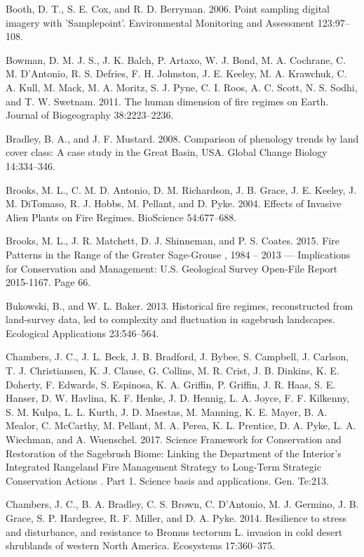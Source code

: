 \documentclass[12pt,]{article}
\begin{document}
\hypertarget{ref-Booth2006}{}
Booth, D. T., S. E. Cox, and R. D. Berryman. 2006. Point sampling
digital imagery with 'Samplepoint'. Environmental Monitoring and
Assessment 123:97--108.

\hypertarget{ref-Bowman2011}{}
Bowman, D. M. J. S., J. K. Balch, P. Artaxo, W. J. Bond, M. A. Cochrane,
C. M. D'Antonio, R. S. Defries, F. H. Johnston, J. E. Keeley, M. A.
Krawchuk, C. A. Kull, M. Mack, M. A. Moritz, S. J. Pyne, C. I. Roos, A.
C. Scott, N. S. Sodhi, and T. W. Swetnam. 2011. The human dimension of
fire regimes on Earth. Journal of Biogeography 38:2223--2236.

\hypertarget{ref-Bradley2008}{}
Bradley, B. A., and J. F. Mustard. 2008. Comparison of phenology trends
by land cover class: A case study in the Great Basin, USA. Global Change
Biology 14:334--346.

\hypertarget{ref-Brooks2004b}{}
Brooks, M. L., C. M. D. Antonio, D. M. Richardson, J. B. Grace, J. E.
Keeley, J. M. DiTomaso, R. J. Hobbs, M. Pellant, and D. Pyke. 2004.
Effects of Invasive Alien Plants on Fire Regimes. BioScience
54:677--688.

\hypertarget{ref-Brooks2015}{}
Brooks, M. L., J. R. Matchett, D. J. Shinneman, and P. S. Coates. 2015.
Fire Patterns in the Range of the Greater Sage-Grouse , 1984 -- 2013 ---
Implications for Conservation and Management: U.S. Geological Survey
Open-File Report 2015-1167. Page 66.

\hypertarget{ref-Bukowski2013}{}
Bukowski, B., and W. L. Baker. 2013. Historical fire regimes,
reconstructed from land-survey data, led to complexity and fluctuation
in sagebrush landscapes. Ecological Applications 23:546--564.

\hypertarget{ref-Chambers2017}{}
Chambers, J. C., J. L. Beck, J. B. Bradford, J. Bybee, S. Campbell, J.
Carlson, T. J. Christiansen, K. J. Clause, G. Collins, M. R. Crist, J.
B. Dinkins, K. E. Doherty, F. Edwards, S. Espinosa, K. A. Griffin, P.
Griffin, J. R. Haas, S. E. Hanser, D. W. Havlina, K. F. Henke, J. D.
Hennig, L. A. Joyce, F. F. Kilkenny, S. M. Kulpa, L. L. Kurth, J. D.
Maestas, M. Manning, K. E. Mayer, B. A. Mealor, C. McCarthy, M. Pellant,
M. A. Perea, K. L. Prentice, D. A. Pyke, L. A. Wiechman, and A.
Wuenschel. 2017. Science Framework for Conservation and Restoration of
the Sagebrush Biome: Linking the Department of the Interior's Integrated
Rangeland Fire Management Strategy to Long-Term Strategic Conservation
Actions . Part 1. Science basis and applications. Gen. Te:213.

\hypertarget{ref-Chambers2014}{}
Chambers, J. C., B. A. Bradley, C. S. Brown, C. D'Antonio, M. J.
Germino, J. B. Grace, S. P. Hardegree, R. F. Miller, and D. A. Pyke.
2014. Resilience to stress and disturbance, and resistance to Bromus
tectorum L. invasion in cold desert shrublands of western North America.
Ecosystems 17:360--375.
\end{document}
